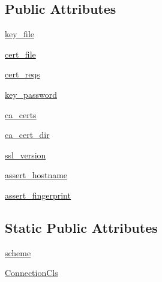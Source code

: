 \subsection*{Public Attributes}
\begin{DoxyCompactItemize}
\item 
\hyperlink{classpip_1_1__vendor_1_1urllib3_1_1connectionpool_1_1HTTPSConnectionPool_a91f850d92b2908c28ea848f5aadc7cc9}{key\+\_\+file}
\item 
\hyperlink{classpip_1_1__vendor_1_1urllib3_1_1connectionpool_1_1HTTPSConnectionPool_a38c06c18f52e0cc174fcc97e2c2eae06}{cert\+\_\+file}
\item 
\hyperlink{classpip_1_1__vendor_1_1urllib3_1_1connectionpool_1_1HTTPSConnectionPool_a7035cf94d9284783abbb3c3298a8f8b9}{cert\+\_\+reqs}
\item 
\hyperlink{classpip_1_1__vendor_1_1urllib3_1_1connectionpool_1_1HTTPSConnectionPool_a4824389dd2dbc5ed6f8dd962f32a28a9}{key\+\_\+password}
\item 
\hyperlink{classpip_1_1__vendor_1_1urllib3_1_1connectionpool_1_1HTTPSConnectionPool_a53b6d1db836fac2e98b869643f8657ae}{ca\+\_\+certs}
\item 
\hyperlink{classpip_1_1__vendor_1_1urllib3_1_1connectionpool_1_1HTTPSConnectionPool_af7dd66c7b6fc187889060104c88ea3c4}{ca\+\_\+cert\+\_\+dir}
\item 
\hyperlink{classpip_1_1__vendor_1_1urllib3_1_1connectionpool_1_1HTTPSConnectionPool_aa0532f875748b661657d6b1c6e5fd8c6}{ssl\+\_\+version}
\item 
\hyperlink{classpip_1_1__vendor_1_1urllib3_1_1connectionpool_1_1HTTPSConnectionPool_a1d872a2c7ce249c0be7c9d8ea7e97082}{assert\+\_\+hostname}
\item 
\hyperlink{classpip_1_1__vendor_1_1urllib3_1_1connectionpool_1_1HTTPSConnectionPool_ad4184ff7389e69ccb0b0040553ccec92}{assert\+\_\+fingerprint}
\end{DoxyCompactItemize}
\subsection*{Static Public Attributes}
\begin{DoxyCompactItemize}
\item 
\hyperlink{classpip_1_1__vendor_1_1urllib3_1_1connectionpool_1_1HTTPSConnectionPool_a3f09274af4da7c3f3ae288c6832cde94}{scheme}
\item 
\hyperlink{classpip_1_1__vendor_1_1urllib3_1_1connectionpool_1_1HTTPSConnectionPool_a28707e816aea3b6fd740f995d888a806}{Connection\+Cls}
\end{DoxyCompactItemize}


